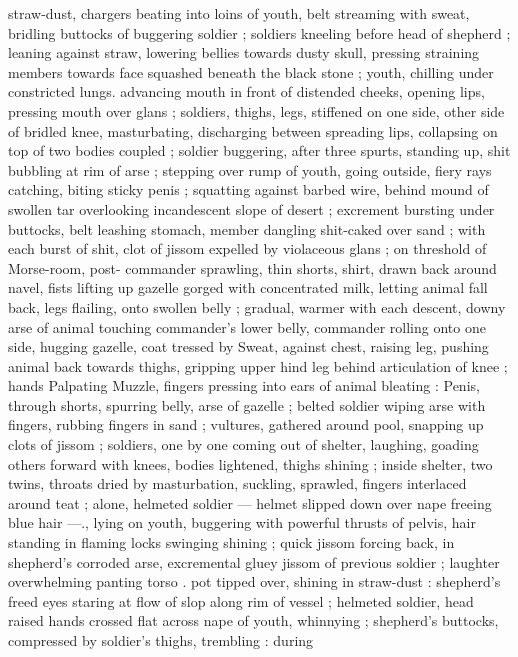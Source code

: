 straw-dust, chargers beating into loins of youth, belt streaming with
sweat, bridling buttocks of buggering soldier ; soldiers kneeling
before head of shepherd ; leaning against straw, lowering bellies
towards dusty skull, pressing straining members towards face
squashed beneath the black stone ; youth, chilling under constricted
lungs. advancing mouth in front of distended cheeks, opening lips,
pressing mouth over glans ; soldiers, thighs, legs, stiffened on one
side, other side of bridled knee, masturbating, discharging between
spreading lips, collapsing on top of two bodies coupled ; soldier
buggering, after three spurts, standing up, shit bubbling at rim of
arse ; stepping over rump of youth, going outside, fiery rays
catching, biting sticky penis ; squatting against barbed wire, behind
mound of swollen tar overlooking incandescent slope of desert ;
excrement bursting under buttocks, belt leashing stomach, member
dangling shit-caked over sand ; with each burst of shit, clot of jissom
expelled by violaceous glans ; on threshold of Morse-room, post-
commander sprawling, thin shorts, shirt, drawn back around navel,
fists lifting up gazelle gorged with concentrated milk, letting animal
fall back, legs flailing, onto swollen belly ; gradual, warmer with each
descent, downy arse of animal touching commander's lower belly,
commander rolling onto one side, hugging gazelle, coat tressed by
Sweat, against chest, raising leg, pushing animal back towards
thighs, gripping upper hind leg behind articulation of knee ; hands
Palpating Muzzle, fingers pressing into ears of animal bleating :
Penis, through shorts, spurring belly, arse of gazelle ; belted soldier
wiping arse with fingers, rubbing fingers in sand ; vultures, gathered
around pool, snapping up clots of jissom ; soldiers, one by one
coming out of shelter, laughing, goading others forward with knees,
bodies lightened, thighs shining ; inside shelter, two twins, throats
dried by masturbation, suckling, sprawled, fingers interlaced around
teat ; alone, helmeted soldier --- helmet slipped down over nape
freeing blue hair ---., lying on youth, buggering with powerful thrusts
of pelvis, hair standing in flaming locks swinging shining ; quick
jissom forcing back, in shepherd's corroded arse, excremental gluey
jissom of previous soldier ; laughter overwhelming panting torso .
pot tipped over, shining in straw-dust : shepherd's freed eyes staring
at flow of slop along rim of vessel ; helmeted soldier, head raised
hands crossed flat across nape of youth, whinnying ; shepherd's
buttocks, compressed by soldier's thighs, trembling : during
